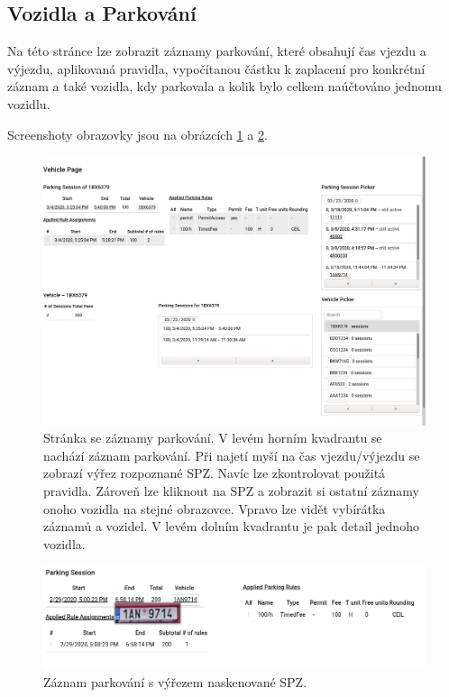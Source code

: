 \subsection{Vozidla a Parkování}

\noindent
Na této stránce lze zobrazit záznamy parkování, které obsahují čas vjezdu a výjezdu,
aplikovaná pravidla, vypočítanou částku k zaplacení pro konkrétní záznam a také vozidla,
kdy parkovala a kolik bylo celkem naúčtováno jednomu vozidlu.

Screenshoty obrazovky jsou na obrázcích \ref{fig:page_vehicles1} a \ref{fig:page_vehicles2}.

\begin{figure}[htb!] \centering
  \includegraphics[width=145mm]{../img/page_vehicles1.png}
  \caption[Stránka se záznamy parkování.]{Stránka se záznamy parkování. V levém horním kvadrantu
  se nachází záznam parkování. Při najetí myší na čas vjezdu/výjezdu se zobrazí výřez rozpoznané SPZ.
  Navíc lze zkontrolovat použitá pravidla.
  Zároveň lze kliknout na SPZ a zobrazit si ostatní záznamy onoho vozidla na stejné obrazovce.
  Vpravo lze vidět vybírátka záznamů a vozidel. V levém dolním kvadrantu je pak detail jednoho
  vozidla.}
  \label{fig:page_vehicles1}
\end{figure}

\begin{figure}[htb!] \centering
  \includegraphics[width=145mm]{../img/page_vehicles2.png}
  \caption[Záznam parkování.]{Záznam parkování s výřezem naskenované SPZ.}
  \label{fig:page_vehicles2}
\end{figure}

